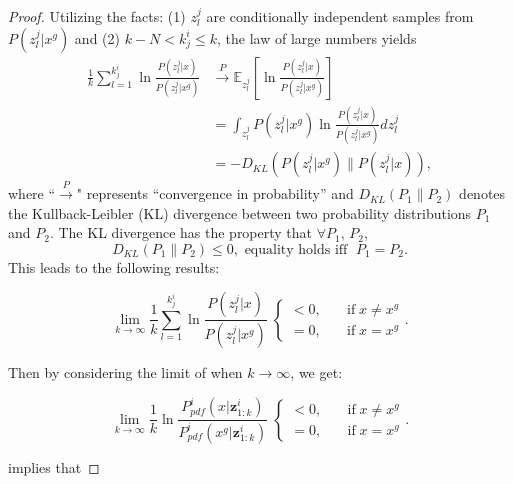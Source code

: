 \documentclass[journal]{IEEEtranTIE}
\theoremstyle{remark}
\newcommand{\xg}{x^g}
\begin{document}
\begin{proof}
		Utilizing the facts: (1) $z^j_l$ are conditionally independent samples from $P(z^j_l|\xg)$ and (2) $k-N<k^i_j\leq k$, the law of large numbers yields
		\small\begin{subequations}\label{eqn:cmp_lim2}
			\begin{align} 
				\frac{1}{k}\sum\limits_{l=1}^{k^i_j}\ln\frac{P(z^j_l|x)}{P(z^j_l|\xg)}&\overset{P}{\longrightarrow}\mathbb{E}_{z^j_l} \left[\ln\frac{P(z^j_l|x)}{P(z^j_l|\xg)}\right]\\
				&=\int_{z^j_l} P(z^j_l|\xg)\ln\frac{P(z^j_l|x)}{P(z^j_l|\xg)} dz^j_l\\
				&=-D_{KL}\left(P(z^j_l|\xg)\|P(z^j_l|x)\right),
			\end{align}
		\end{subequations}\normalsize
		where ``$\overset{P}{\longrightarrow}$" represents ``convergence in probability'' and $D_{KL}(P_1\|P_2)$ denotes the Kullback-Leibler (KL) divergence between two probability distributions $P_1$ and $P_2$.
		The KL divergence has the property \cite{mackay2003information} that $\forall P_1,\,P_2$,
		\begin{equation*}
			D_{KL}(P_1\|P_2)\leq 0, \text{ equality holds iff } \; P_1=P_2.
		\end{equation*}
		This leads to the following results:
		
		\begin{equation*}
			\lim\limits_{k\rightarrow \infty}\frac{1}{k}\sum\limits_{l=1}^{k^i_j}\ln\frac{P(z^j_l|x)}{P(z^j_l|\xg)}\;
			\begin{cases}
				<0,&\quad \text{if}\; x\neq \xg\\
				=0,&\quad \text{if}\; x= \xg
			\end{cases}.
		\end{equation*}
		
		Then by considering the limit of  when $k\rightarrow\infty$, we get:
		
		\begin{equation}\label{subeqn:limit}
			\lim\limits_{k\rightarrow \infty}\frac{1}{k}\ln\frac{P^i_{pdf}(x|\mathbf{z}^{i}_{1:k})}{P^i_{pdf}(\xg|\mathbf{z}^{i}_{1:k})}\;
			\begin{cases}
				<0,&\quad \text{if}\; x\neq \xg\\
				=0,&\quad \text{if}\; x= \xg
			\end{cases}.
		\end{equation}
		
		 implies that
		

\end{proof}
\end{document}
